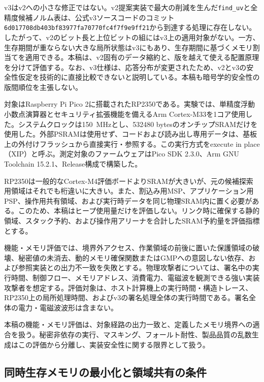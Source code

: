 \documentclass[a4paper,10pt]{ltjsarticle}
\theoremstyle{definition}
\theoremstyle{remark}
\begin{document}
v3はv2への小さな修正ではない。v2提案実装で最大の削減を生んだ\texttt{find\_uv}と全精度候補ノルム表は、公式v3ソースコードのコミット\texttt{6d017708db403bf83977fa70770fc4f7f9e9ff21}から到達する処理に存在しない\cite{sqisign-code-v3}。したがって、v2のビット長と上位ビットの組にはv3上の適用対象がない。一方、生存期間が重ならない大きな局所状態はv3にもあり、生存期間に基づくメモリ割当てを適用できる。本稿は、v2固有のデータ縮約と、版を越えて使える配置原理を分けて評価する。なお、v3仕様は、応答分布が変更されたため、v2とv3の安全性仮定を技術的に直接比較できないと説明している\cite{sqisign-spec-v3}。本稿も暗号学的安全性の版間順位を主張しない。

対象はRaspberry Pi Pico 2に搭載されたRP2350である。実験では、単精度浮動小数点演算器とセキュリティ拡張機能を備えるArm Cortex-M33\cite{rp2350-datasheet}を1コア使用した。システムクロックは\SI{150}{\mega\hertz}とし、\num{532480} bytesのオンチップSRAMだけを使用した。外部PSRAMは使用せず、コードおよび読み出し専用データは、基板上の外付けフラッシュから直接実行・参照する。この実行方式をexecute in place（XIP）と呼ぶ。測定対象のファームウェアはPico SDK 2.3.0、Arm GNU Toolchain 15.2.1、Release構成で構築した。

RP2350は一般的なCortex-M4評価ボードよりSRAMが大きいが、元の候補探索用領域はそれでも桁違いに大きい。また、割込み用MSP、アプリケーション用PSP、操作用共有領域、および実行時データを同じ物理SRAM内に置く必要がある。このため、本稿はヒープ使用量だけを評価しない。リンク時に確保する静的領域、スタック予約、および操作用アリーナを合計したSRAM予約量を評価指標とする。

\label{sec:threat-model}

機能・メモリ評価では、境界外アクセス、作業領域の前後に置いた保護領域の破壊、秘密値の未消去、動的メモリ確保関数またはGMPへの意図しない依存、および参照実装との出力不一致を失敗とする。物理攻撃者については、署名中の実行時間、制御フロー、メモリアドレス、消費電力、電磁波を観測できる強い実装攻撃者を想定する。評価対象は、ホスト計算機上の実行時間・構造トレース、RP2350上の局所処理時間、およびv3の署名処理全体の実行時間である。署名全体の電力・電磁波波形は含まない。

本稿の機能・メモリ評価は、対象経路の出力一致と、定義したメモリ境界への適合を扱う。秘密非依存の実行、マスキング、フォールト耐性、製品品質の乱数生成はこの評価から分離し、実装安全性に関する限界として扱う。

\subsection{同時生存メモリの最小化と領域共有の条件}
\label{sec:formulation}
\end{document}
